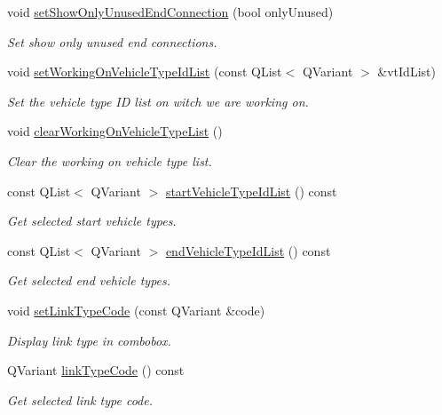 \begin{DoxyCompactItemize}
void \hyperlink{classmdt_cl_unit_link_dialog_a1a2c3bcd9cdc90b57363a2b34b180f4c}{set\-Show\-Only\-Unused\-End\-Connection} (bool only\-Unused)
\begin{DoxyCompactList}\small\item\em Set show only unused end connections. \end{DoxyCompactList}\item 
void \hyperlink{classmdt_cl_unit_link_dialog_a9a3bc3f1de4e3d7dc6bc090965ab7bbc}{set\-Working\-On\-Vehicle\-Type\-Id\-List} (const Q\-List$<$ Q\-Variant $>$ \&vt\-Id\-List)
\begin{DoxyCompactList}\small\item\em Set the vehicle type I\-D list on witch we are working on. \end{DoxyCompactList}\item 
void \hyperlink{classmdt_cl_unit_link_dialog_a35865311a515cd14f4d6b5d4830238a2}{clear\-Working\-On\-Vehicle\-Type\-List} ()
\begin{DoxyCompactList}\small\item\em Clear the working on vehicle type list. \end{DoxyCompactList}\item 
const Q\-List$<$ Q\-Variant $>$ \hyperlink{classmdt_cl_unit_link_dialog_a38fb21e39ed2f2e1d65a68a424895ac4}{start\-Vehicle\-Type\-Id\-List} () const 
\begin{DoxyCompactList}\small\item\em Get selected start vehicle types. \end{DoxyCompactList}\item 
const Q\-List$<$ Q\-Variant $>$ \hyperlink{classmdt_cl_unit_link_dialog_abe96eb187294372b022b2a8ba9c645b6}{end\-Vehicle\-Type\-Id\-List} () const 
\begin{DoxyCompactList}\small\item\em Get selected end vehicle types. \end{DoxyCompactList}\item 
void \hyperlink{classmdt_cl_unit_link_dialog_a34ab2fabffeb5b889be8db9ac08add22}{set\-Link\-Type\-Code} (const Q\-Variant \&code)
\begin{DoxyCompactList}\small\item\em Display link type in combobox. \end{DoxyCompactList}\item 
Q\-Variant \hyperlink{classmdt_cl_unit_link_dialog_aa7d8b93582d68113b6d00922e4979e78}{link\-Type\-Code} () const 
\begin{DoxyCompactList}\small\item\em Get selected link type code. \end{DoxyCompactList}\item 

\end{DoxyCompactItemize}
